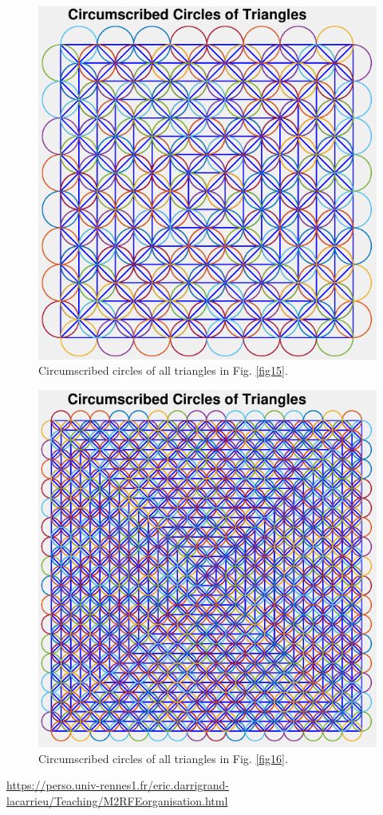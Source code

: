 \documentclass[11pt,a4paper,center,notitlepage]{article}
\numberwithin{equation}{section}
\begin{document}
\begin{figure}[H]
\centering
\includegraphics[scale=0.9]{12}
\caption{Circumscribed circles of all triangles in Fig. \ref{fig15}.}
\end{figure}

\begin{figure}[H]
\centering
\includegraphics[scale=0.9]{13}
\caption{Circumscribed circles of all triangles in Fig. \ref{fig16}.}
\end{figure}

\begin{thebibliography}{999}
 \url{https://perso.univ-rennes1.fr/eric.darrigrand-lacarrieu/Teaching/M2RFEorganisation.html}
\end{thebibliography}
\end{document}
